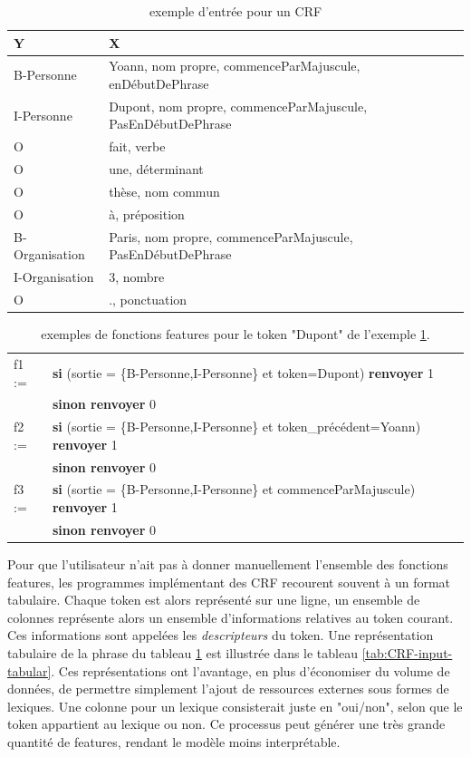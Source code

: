\documentclass[12pt,a4paper,times,twoside,openright]{report}
\begin{document}
\begin{table}[ht!]
\begin{tabular}{|l|l|}
\hline
Y              & X \\
\hline
B-Personne     & Yoann, nom propre, commenceParMajuscule, enDébutDePhrase \\
I-Personne     & Dupont, nom propre, commenceParMajuscule, PasEnDébutDePhrase \\
O              & fait, verbe \\
O              & une, déterminant \\
O              & thèse, nom commun \\
O              & à, préposition \\
B-Organisation & Paris, nom propre, commenceParMajuscule, PasEnDébutDePhrase \\
I-Organisation & 3, nombre \\
O              & ., ponctuation \\
\hline
\end{tabular}
\caption{exemple d'entrée pour un CRF}
\label{tab:CRF-input-example}
\end{table}

\begin{table}[ht!]
\begin{tabular}{ll}
f1 := & \textbf{si} (sortie = \{B-Personne,I-Personne\} et token=Dupont) \textbf{renvoyer} 1 \\
      & \textbf{sinon renvoyer} 0 \\
f2 := & \textbf{si} (sortie = \{B-Personne,I-Personne\} et token\_précédent=Yoann) \textbf{renvoyer} 1 \\
      & \textbf{sinon renvoyer} 0 \\
f3 := & \textbf{si} (sortie = \{B-Personne,I-Personne\} et commenceParMajuscule) \textbf{renvoyer} 1 \\
      & \textbf{sinon renvoyer} 0 \\
\end{tabular}
\caption{exemples de fonctions features pour le token "Dupont" de l'exemple \ref{tab:CRF-input-example}.}
\label{tab:CRF-feature-function-example}
\end{table}

Pour que l'utilisateur n'ait pas à donner manuellement l'ensemble des fonctions features, les programmes implémentant des CRF recourent souvent à un format tabulaire. Chaque token est alors représenté sur une ligne, un ensemble de colonnes représente alors un ensemble d'informations relatives au token courant. Ces informations sont appelées les \emph{descripteurs} du token. Une représentation tabulaire de la phrase du tableau \ref{tab:CRF-input-example} est illustrée dans le tableau \ref{tab:CRF-input-tabular}. Ces représentations ont l'avantage, en plus d'économiser du volume de données, de permettre simplement l'ajout de ressources externes sous formes de lexiques. Une colonne pour un lexique consisterait juste en "oui/non", selon que le token appartient au lexique ou non. Ce processus peut générer une très grande quantité de features, rendant le modèle moins interprétable.
\end{document}

